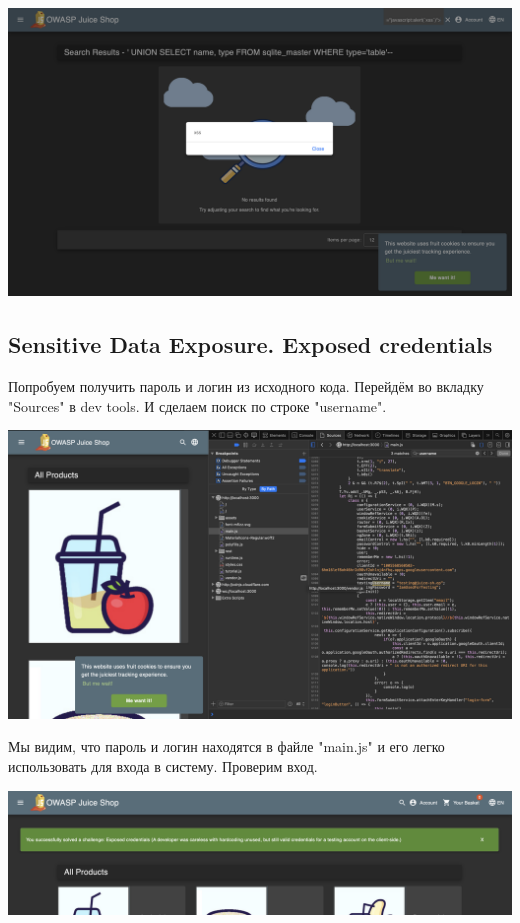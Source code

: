 \documentclass{article}
\begin{document}
\begin{center}
  \includegraphics[width=.9\textwidth]{x11}
\end{center}


\subsection{Sensitive Data Exposure. Exposed credentials}

Попробуем получить пароль и логин из исходного кода. Перейдём во вкладку "Sources" в dev tools. И сделаем поиск по строке "username".

\begin{center}
  \includegraphics[width=.9\textwidth]{e1}
\end{center}

Мы видим, что пароль и логин находятся в файле "main.js" и его легко использовать для входа в систему.
Проверим вход.

\begin{center}
  \includegraphics[width=.9\textwidth]{e11}
\end{center}
\end{document}
